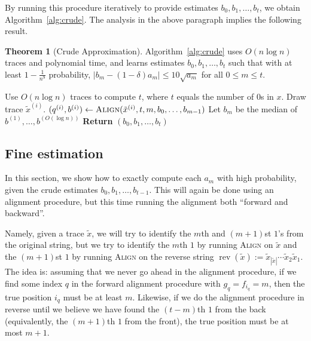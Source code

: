 \documentclass[12pt]{article}
\theoremstyle{definition}
\newtheorem{theorem}{Theorem}[section]
\theoremstyle{remark}
\DeclareMathOperator{\rev}{rev}
\begin{document}
By running this procedure iteratively to provide estimates $b_0, b_1, \dots, b_{t}$, we obtain Algorithm~\ref{alg:crude}. The analysis in the above paragraph implies the following result.

\begin{theorem}[Crude Approximation] \label{thm:crude}
    Algorithm~\ref{alg:crude} uses $O(n \log n)$ traces and polynomial time, and learns estimates $b_0, b_1, \dots, b_{t}$ such that with at least $1 - \frac{1}{n^9}$ probability, $|b_m-(1-\delta) a_m| \le 10 \sqrt{a_m}$ for all $0 \le m \le t$.
\end{theorem}

\begin{algorithm}
\caption{Crude Estimation of all gaps}
\label{alg:crude}
\begin{algorithmic}[1]
\State Use $O(n \log n)$ traces to compute $t$, where $t$ equals the number of $0$s in $x$.
        \State Draw trace $\tilde{x}^{(i)}$.
        \State $(q^{(i)}, b^{(i)}) \leftarrow \textsc{Align}(\tilde{x}^{(i)}, t, m, b_0, \dots, b_{m-1})$
    \EndFor
    \State Let $b_m$ be the median of $b^{(1)}, \dots, b^{(O(\log n))}$ 
\EndFor
\State \textbf{Return} $(b_0, b_1, \dots, b_{t})$
\EndProcedure
\end{algorithmic}
\end{algorithm}

\subsection{Fine estimation}

In this section, we show how to exactly compute each $a_m$ with high probability, given the crude estimates $b_0, b_1, \dots, b_{t-1}$. This will again be done using an alignment procedure, but this time running the alignment both ``forward and backward''.

Namely, given a trace $\tilde{x}$, we will try to identify the $m$th and $(m+1)$st $1$'s from the original string, but we try to identify the $m$th $1$ by running \textsc{Align} on $\tilde{x}$ and the $(m+1)$st $1$ by running \textsc{Align} on the reverse string $\rev(\tilde{x}) := \tilde{x}_{|\tilde{x}|} \cdots \tilde{x}_2 \tilde{x}_1$. The idea is: assuming that we never go ahead in the alignment procedure, if we find some index $q$ in the forward alignment procedure with $g_q = f_{i_q} = m$, then the true position $i_q$ must be at least $m$. Likewise, if we do the alignment procedure in reverse until we believe we have found the $(t-m)$th $1$ from the back (equivalently, the $(m+1)$th $1$ from the front), the true position must be at most $m+1$.
\end{document}
